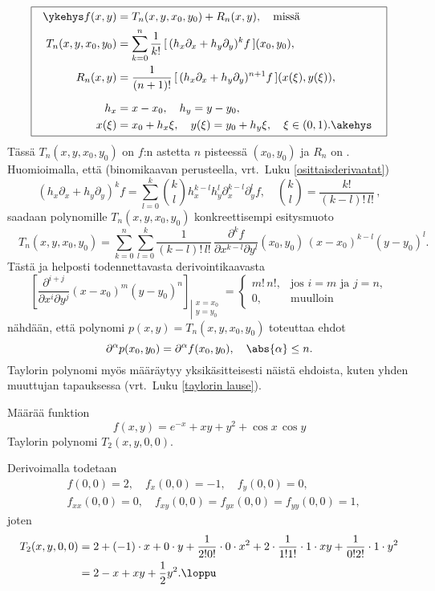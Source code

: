 \[
\boxed{\begin{aligned}\ykehys
f(x,y)   &= T_n(x,y,x_0,y_0)+R_n(x,y), \quad \text{missä} \\
\quad T_n(x,y,x_0,y_0) 
         &= \sum_{k=0}^n \frac{1}{k!}\,[\,(h_x\partial_x+h_y\partial_y)^kf\,](x_0,y_0), \\
R_n(x,y) &=\frac{1}{(n+1)!}\,[\,(h_x\partial_x + h_y\partial_y)^{n+1}f\,](x(\xi),y(\xi)),\\[2mm]
h_x      &= x-x_0,\quad h_y=y-y_0, \\
x(\xi)   &= x_0+h_x\xi,\quad y(\xi)=y_0+h_y\xi,\quad \xi\in (0,1). \akehys\quad
\end{aligned}}
\]
Tässä $T_n(x,y,x_0,y_0)$ on $f$:n  astetta $n$ pisteessä $(x_0,y_0)$ ja
%
$R_n$ on . Huomioimalla, että (binomikaavan perusteella, vrt.\
Luku \ref{osittaisderivaatat})
\[
(h_x\partial_x+h_y\partial_y)^k f 
        = \sum_{l=0}^k \binom{k}{l}h_x^{k-l}h_y^l\partial_x^{k-l}\partial_y^l f, \quad
          \binom{k}{l}=\frac{k!}{(k-l)!\,l!}\,,
\]
saadaan polynomille $T_n(x,y,x_0,y_0)$ konkreettisempi esitysmuoto
\[
\boxed{\quad T_n(x,y,x_0,y_0)=\sum_{k=0}^n\sum_{l=0}^k \frac{1}{(k-l)!\, l!}\,
   \frac{\partial^k f}{\partial x^{k-l}\partial y^l}(x_0,y_0)\,(x-x_0)^{k-l}(y-y_0)^l. \quad}
\]
Tästä ja helposti todennettavasta derivointikaavasta
\[
\left[\frac{\partial^{i+j}}{\partial x^i\partial y^j}(x-x_0)^m(y-y_0)^n\right]_
                                  {\left|\begin{array}{l} 
                                   \scriptstyle{x=x_0} \\ 
                                   \scriptstyle{y=y_0} \end{array}\right.}
=\begin{cases} m!\,n!, &\text{jos $i=m$ ja $j=n$}, \\ 0, &\text{muulloin} \end{cases}
\]
nähdään, että polynomi $p(x,y)=T_n(x,y,x_0,y_0)$ toteuttaa ehdot
\[
\partial^\alpha p(x_0,y_0)=\partial^\alpha f(x_0,y_0),\quad \abs{\alpha}\leq n.
\]
Taylorin polynomi myös määräytyy yksikäsitteisesti näistä ehdoista, kuten yhden muuttujan
tapauksessa (vrt.\ Luku \ref{taylorin lause}).
\begin{Exa}
Määrää funktion
\[
f(x,y)=e^{-x}+xy+y^2+\cos x\,\cos y
\]
Taylorin polynomi $T_2(x,y,0,0)$.
\end{Exa}
\ratk Derivoimalla todetaan
\begin{align*}
&f(0,0)=2, \quad f_x(0,0)=-1, \quad f_y(0,0)=0, \\
&f_{xx}(0,0)=0, \quad f_{xy}(0,0)=f_{yx}(0,0)=f_{yy}(0,0)=1,
\end{align*}
joten
\begin{align*}
T_2(x,y,0,0) &= 2 +(-1) \cdot x + 0 \cdot y
                  +\frac{1}{2!0!} \cdot 0 \cdot x^2 
                  +2\cdot\frac{1}{1!1!} \cdot 1 \cdot xy
                  +\frac{1}{0!2!} \cdot 1 \cdot y^2 \\
             &= 2-x+xy+\frac{1}{2}y^2. \loppu
\end{align*}

